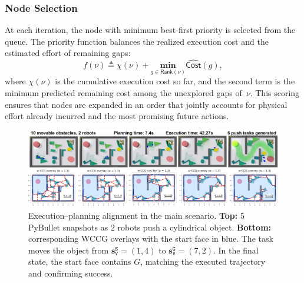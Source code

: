 \subsubsection{Node Selection}
At each iteration, the node with minimum best-first priority is selected from
the queue. The priority function balances the realized execution cost and the
estimated effort of remaining gaps:
\begin{equation}\label{eq:priority}
  f(\nu)\triangleq \chi(\nu)+\underset{g\in \textsf{Rank}(\nu)}{\textbf{min}}
  \widehat{\mathsf{Cost}}(g),
\end{equation}
where $\chi(\nu)$ is the cumulative execution cost so far, and the second term
is the minimum predicted remaining cost among the unexplored gaps of~$\nu$.
This scoring ensures that nodes are expanded in an order that jointly accounts
for physical effort already incurred and the most promising future actions.

\begin{figure}[t!]
  \centering
  \includegraphics[width=0.95\linewidth]{figures/sim_exp.png}
  \vspace{-0.15in}
\caption{Execution--planning alignment in the main scenario.
\textbf{Top:} $5$  PyBullet snapshots as $2$ robots push a cylindrical object.
\textbf{Bottom:} corresponding WCCG overlays with the start face in blue.
The task moves the object from \(\mathbf{s}^{\texttt{S}}_{\texttt{V}}=(1,4)\) to \(\mathbf{s}^{\texttt{G}}_{\texttt{V}}=(7,2)\).
In the final state,
the start face contains \(G\), matching the executed trajectory and confirming success.}
\vspace{-0.1in}
\label{fig:simloop}
\end{figure}

